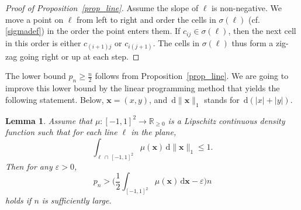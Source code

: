 \documentclass[11pt,a4paper]{amsart}
\newtheorem{lemma}[theorem]{Lemma}
\newcommand{\R}{\mathbb{R}}
\newcommand{\eps}{\varepsilon}
\newcommand{\dd}{\,\mathrm{d}}
\newcommand{\x}{\mathbf{x}}
\begin{document}
\begin{proof}[Proof of Proposition~\ref{prop_line}]
 Assume the slope of $\ell$ is non-negative. We move a point on $\ell$ from left to right and order the cells in $\sigma(\ell)$ (cf. \eqref{sigmadef}) in the order the point enters them. If $c_{ij}\in \sigma(\ell)$, then the next cell in this order is either $c_{(i+1)j}$ or $c_{i(j+1)}$. The cells in $\sigma(\ell)$ thus form a zig-zag going right or up at each step.
\end{proof}

The lower bound $p_n \geq \frac n 2$ follows from Proposition~\ref{prop_line}. We are going to improve this lower bound by the linear programming method that yields the following
statement. Below, $\x = (x, y)$, and $\dd \|\x\|_1$ stands for $\dd(|x| + |y|)$.

\begin{lemma}\label{lemma_LPest}
Assume that $\mu: [-1,1]^2 \rightarrow \R_{\geq 0}$ is a Lipschitz continuous density function such that for each line $\ell$ in the plane,
\begin{equation}\label{ellcond}
  \int_{\ell \,\cap\, [-1,1]^2} \mu(\x) \dd \|\x\|_1 \leq 1.
\end{equation}
Then for any $\eps> 0$,
\[
p_n > \Big (  \frac 1 2 \int_{[-1,1]^2} \mu(\x) \dd \x  - \eps \Big ) n
\]
holds if $n$ is sufficiently large.
\end{lemma}
\end{document}
